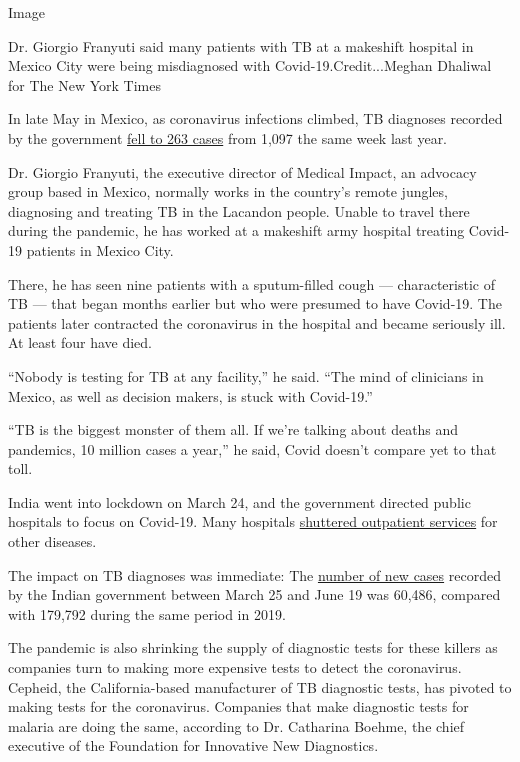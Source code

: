 Image

Dr. Giorgio Franyuti said many patients with TB at a makeshift hospital
in Mexico City were being misdiagnosed with Covid-19.Credit...Meghan
Dhaliwal for The New York Times

In late May in Mexico, as coronavirus infections climbed, TB diagnoses
recorded by the government
\href{https://www.gob.mx/salud/acciones-y-programas/direccion-general-de-epidemiologia-boletin-epidemiologico}{fell
to 263 cases} from 1,097 the same week last year.

Dr. Giorgio Franyuti, the executive director of Medical Impact, an
advocacy group based in Mexico, normally works in the country's remote
jungles, diagnosing and treating TB in the Lacandon people. Unable to
travel there during the pandemic, he has worked at a makeshift army
hospital treating Covid-19 patients in Mexico City.

There, he has seen nine patients with a sputum-filled cough ---
characteristic of TB --- that began months earlier but who were presumed
to have Covid-19. The patients later contracted the coronavirus in the
hospital and became seriously ill. At least four have died.

``Nobody is testing for TB at any facility,'' he said. ``The mind of
clinicians in Mexico, as well as decision makers, is stuck with
Covid-19.''

``TB is the biggest monster of them all. If we're talking about deaths
and pandemics, 10 million cases a year,'' he said, Covid doesn't compare
yet to that toll.

India went into lockdown on March 24, and the government directed public
hospitals to focus on Covid-19. Many hospitals
\href{https://timesofindia.indiatimes.com/india/how-covid-war-is-hurting-indias-non-covid-patients/articleshow/74949121.cms}{shuttered
outpatient services} for other diseases.

The impact on TB diagnoses was immediate: The
\href{https://reports.nikshay.in/Reports/TBNotification}{number of new
cases} recorded by the Indian government between March 25 and June 19
was 60,486, compared with 179,792 during the same period in 2019.

The pandemic is also shrinking the supply of diagnostic tests for these
killers as companies turn to making more expensive tests to detect the
coronavirus. Cepheid, the California-based manufacturer of TB diagnostic
tests, has pivoted to making tests for the coronavirus. Companies that
make diagnostic tests for malaria are doing the same, according to Dr.
Catharina Boehme, the chief executive of the Foundation for Innovative
New Diagnostics.

